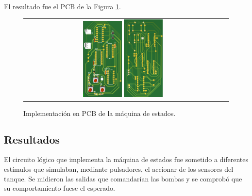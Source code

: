 El resultado fue el PCB de la Figura \ref{fig:pcb_3d_view_ex1}.
\begin{figure}[H]
    \centering
    \begin{tabular} {c c}
        \includegraphics[width=0.2\textwidth]{../EJ1/Recursos/pcb_front.png}
        \includegraphics[width=0.2\textwidth]{../EJ1/Recursos/pcb_back.png}
    \end{tabular}
    \caption{Implementación en PCB de la máquina de estados.}
    \label{fig:pcb_3d_view_ex1}
\end{figure}



\subsection{Resultados}
El circuito lógico que implementa la máquina de estados fue sometido a diferentes estímulos que simulaban, mediante pulsadores, el accionar de los sensores del tanque.
Se midieron las salidas que comandarían las bombas y se comprobó que su comportamiento fuese el esperado.

